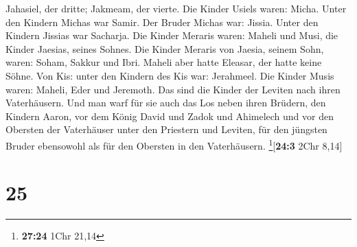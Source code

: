 Jahasiel, der dritte; Jakmeam, der vierte.  Die Kinder
Usiels waren: Micha. Unter den Kindern Michas war Samir. 
Der Bruder Michas war: Jissia. Unter den Kindern Jissias war Sacharja.
 Die Kinder Meraris waren: Maheli und Musi, die Kinder
Jaesias, seines Sohnes.  Die Kinder Meraris von Jaesia,
seinem Sohn, waren: Soham, Sakkur und Ibri.  Maheli aber
hatte Eleasar, der hatte keine Söhne.  Von Kis: unter den
Kindern des Kis war: Jerahmeel.  Die Kinder Musis waren:
Maheli, Eder und Jeremoth. Das sind die Kinder der Leviten nach ihren
Vaterhäusern.  Und man warf für sie auch das Los neben
ihren Brüdern, den Kindern Aaron, vor dem König David und Zadok und
Ahimelech und vor den Obersten der Vaterhäuser unter den Priestern und
Leviten, für den jüngsten Bruder ebensowohl als für den Obersten in den
Vaterhäusern. \footnote{\textbf{27:24} 1Chr 21,14}{[}\textbf{24:3} 2Chr
8,14{]}

\hypertarget{section-24}{%
\section{25}\label{section-24}}

